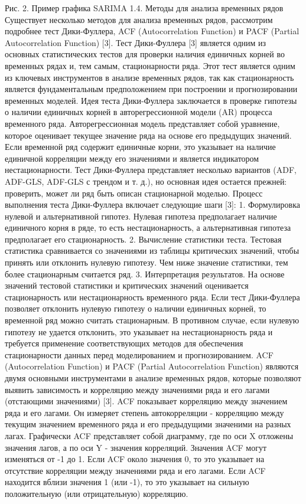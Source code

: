 Рис. 2. Пример графика SARIMA
1.4. Методы для анализа временных рядов
Существует несколько методов для анализа временных рядов, рассмотрим подробнее тест Дики-Фуллера, ACF (Autocorrelation Function) и PACF (Partial Autocorrelation Function) [3].
Тест Дики-Фуллера [3] является одним из основных статистических тестов для проверки наличия единичных корней во временных рядах и, тем самым, стационарности ряда. Этот тест является одним из ключевых инструментов в анализе временных рядов, так как стационарность является фундаментальным предположением при построении и прогнозировании временных моделей.
Идея теста Дики-Фуллера заключается в проверке гипотезы о наличии единичных корней в авторегрессионной модели (AR) процесса временного ряда. Авторегрессионная модель представляет собой уравнение, которое оценивает текущее значение ряда на основе его предыдущих значений. Если временной ряд содержит единичные корни, это указывает на наличие единичной корреляции между его значениями и является индикатором нестационарности.
Тест Дики-Фуллера представляет несколько вариантов (ADF, ADF-GLS, ADF-GLS с трендом и т. д.), но основная идея остается прежней: проверить, может ли ряд быть описан стационарной моделью.
Процесс выполнения теста Дики-Фуллера включает следующие шаги [3]:
1. Формулировка нулевой и альтернативной гипотез. Нулевая гипотеза предполагает наличие единичного корня в ряде, то есть нестационарность, а альтернативная гипотеза предполагает его стационарность.
2. Вычисление статистики теста. Тестовая статистика сравнивается со значениями из таблицы критических значений, чтобы принять или отклонить нулевую гипотезу. Чем ниже значение статистики, тем более стационарным считается ряд.
3. Интерпретация результатов. На основе значений тестовой статистики и критических значений оценивается стационарность или нестационарность временного ряда.
Если тест Дики-Фуллера позволяет отклонить нулевую гипотезу о наличии единичных корней, то временной ряд можно считать стационарным. В противном случае, если нулевую гипотезу не удается отклонить, это указывает на нестационарность ряда и требуется применение соответствующих методов для обеспечения стационарности данных перед моделированием и прогнозированием.
ACF (Autocorrelation Function) и PACF (Partial Autocorrelation Function) являются двумя основными инструментами в анализе временных рядов, которые позволяют выявить зависимость и корреляцию между значениями ряда и его лагами (отстающими значениями) [3].
ACF показывает корреляцию между значением ряда и его лагами. Он измеряет степень автокорреляции - корреляцию между текущим значением временного ряда и его предыдущими значеними на разных лагах. Графически ACF представляет собой диаграмму, где по оси X отложены значения лагов, а по оси Y - значения корреляций. Значения ACF могут изменяться от -1 до 1. Если ACF около значения 0, то это указывает на отсутствие корреляции между значениями ряда и его лагами. Если ACF находится вблизи значения 1 (или -1), то это указывает на сильную положительную (или отрицательную) корреляцию. 
